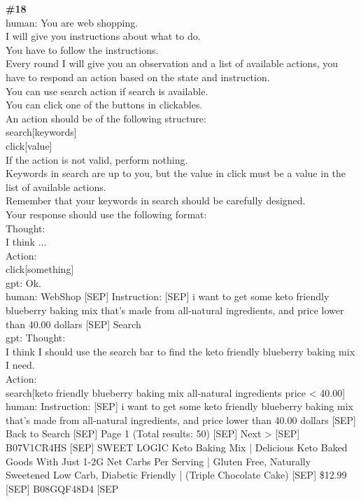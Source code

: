 \documentclass[10pt]{article}
\begin{document}
\begin{Form}
\vspace{8pt}
\begin{tcolorbox}[colback=convbg,colframe=itemframe,boxrule=0.8pt,arc=2pt,breakable,left=6pt,right=6pt,top=5pt,bottom=5pt]
{\footnotesize\textbf{\#18}}\\[3pt]
{\footnotesize human: You are web shopping. \\[2pt]
I will give you instructions about what to do. \\[2pt]
You have to follow the instructions. \\[2pt]
Every round I will give you an observation and a list of available actions, you have to respond an action based on the state and instruction. \\[2pt]
You can use search action if search is available. \\[2pt]
You can click one of the buttons in clickables. \\[2pt]
An action should be of the following structure: \\[2pt]
search[keywords] \\[2pt]
click[value] \\[2pt]
If the action is not valid, perform nothing. \\[2pt]
Keywords in search are up to you, but the value in click must be a value in the list of available actions. \\[2pt]
Remember that your keywords in search should be carefully designed. \\[2pt]
Your response should use the following format: \\[2pt]
Thought: \\[2pt]
I think ... \\[2pt]
Action: \\[2pt]
click[something] \\[2pt]
gpt: Ok. \\[2pt]
human: WebShop [SEP] Instruction: [SEP] i want to get some keto friendly blueberry baking mix that's made from all-natural ingredients, and price lower than 40.00 dollars [SEP] Search \\[2pt]
gpt: Thought: \\[2pt]
I think I should use the search bar to find the keto friendly blueberry baking mix I need. \\[2pt]
Action: \\[2pt]
search[keto friendly blueberry baking mix all-natural ingredients price < 40.00] \\[2pt]
human: Instruction: [SEP] i want to get some keto friendly blueberry baking mix that's made from all-natural ingredients, and price lower than 40.00 dollars [SEP] Back to Search [SEP] Page 1 (Total results: 50) [SEP] Next > [SEP] B07V1CR4HS [SEP] SWEET LOGIC Keto Baking Mix | Delicious Keto Baked Goods With Just 1-2G Net Carbs Per Serving | Gluten Free, Naturally Sweetened Low Carb, Diabetic Friendly | (Triple Chocolate Cake) [SEP] \$12.99 [SEP] B08GQF48D4 [SEP}

\end{tcolorbox}
\end{Form}
\end{document}
